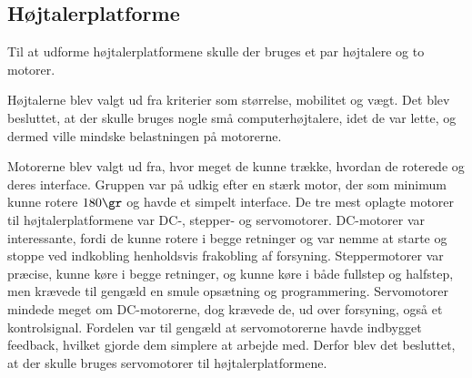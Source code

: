 \newpage
\subsection{Højtalerplatforme}
Til at udforme højtalerplatformene skulle der bruges et par højtalere og to motorer. 

Højtalerne blev valgt ud fra kriterier som størrelse, mobilitet og vægt. Det blev besluttet, at der skulle bruges nogle små computerhøjtalere, idet de var lette, og dermed ville mindske belastningen på motorerne. 

Motorerne blev valgt ud fra, hvor meget de kunne trække, hvordan de roterede og deres interface. Gruppen var på udkig efter en stærk motor, der som minimum kunne rotere $180\gr$ og havde et simpelt interface. De tre mest oplagte motorer til højtalerplatformene var DC-, stepper- og servomotorer.\newline
DC-motorer var interessante, fordi de kunne rotere i begge retninger og var nemme at starte og stoppe ved indkobling henholdsvis frakobling af forsyning.\newline
Steppermotorer var præcise, kunne køre i begge retninger, og kunne køre i både fullstep og halfstep, men krævede til gengæld en smule opsætning og programmering.\newline
Servomotorer mindede meget om DC-motorerne, dog krævede de, ud over forsyning, også et kontrolsignal. Fordelen var til gengæld at servomotorerne havde indbygget feedback, hvilket gjorde dem simplere at arbejde med. Derfor blev det besluttet, at der skulle bruges servomotorer til højtalerplatformene.
